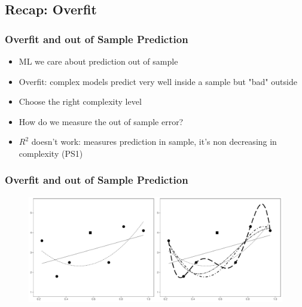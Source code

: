 \documentclass[
  shownotes,
  xcolor={svgnames},
  hyperref={colorlinks,citecolor=DarkBlue,linkcolor=DarkRed,urlcolor=DarkBlue}
  , aspectratio=169]{beamer}
\begin{document}
\subsection{Recap: Overfit }
\begin{frame}[fragile]
\frametitle{Overfit and out of Sample Prediction}


\begin{itemize}
  \item ML we care about prediction out of sample
  \medskip
  \item Overfit: complex models predict very well inside a sample but "bad" outside
  \medskip
  \item Choose the right complexity level
  \medskip
  \item How do we measure the out of sample error?
  \medskip
  \item $R^2$ doesn't work: measures prediction in sample, it's non decreasing in complexity (PS1)
\end{itemize}

\end{frame}
\begin{frame}[fragile]
\frametitle{Overfit and out of Sample Prediction}


        \begin{figure}[H] \centering
            \captionsetup{justification=centering}
              \includegraphics[scale=0.4]{figures/Fig0}
 \end{figure}

\end{frame}
\end{document}
